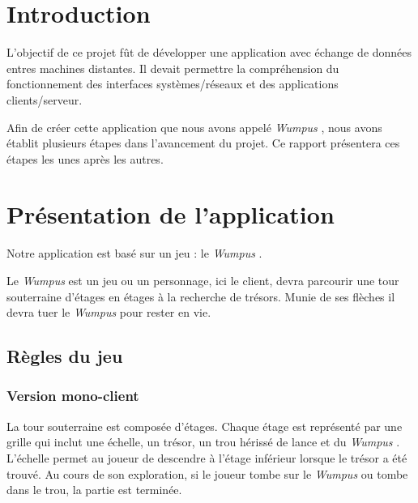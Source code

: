 \documentclass[a4paper,10pt]{article}
\newcommand{\gameName}{\emph{Wumpus }}
\begin{document}
	\newpage
	\tableofcontents

	\newpage
	\pagestyle{fancy}

	\section{Introduction}
	L'objectif de ce projet fût de développer une application avec échange de données entres machines distantes. Il devait permettre la compréhension du
	fonctionnement des interfaces systèmes/réseaux et des applications clients/serveur.

	Afin de créer cette application que nous avons appelé \gameName, nous avons établit plusieurs étapes dans l'avancement du projet. Ce rapport
	présentera  ces étapes  les unes après  les autres.


	\newpage
	\section{Présentation de l'application}
	Notre application est basé sur un jeu : le \gameName.

	Le \gameName est un jeu ou un personnage, ici le client, devra parcourir une tour souterraine d'étages en étages à la recherche de trésors. %
	Munie de ses flèches il devra tuer le \gameName pour rester en vie.

	\subsection{Règles du jeu}
		\subsubsection{Version mono-client}
			La tour souterraine est composée d'étages.
			Chaque étage est représenté par une grille qui inclut une échelle, un trésor, un trou hérissé de lance et du \gameName.
			L'échelle permet au joueur de descendre à l'étage inférieur lorsque le trésor a été trouvé. Au cours de son exploration, si le joueur tombe sur le
	\gameName ou tombe dans le trou, la partie est terminée.
\end{document}

